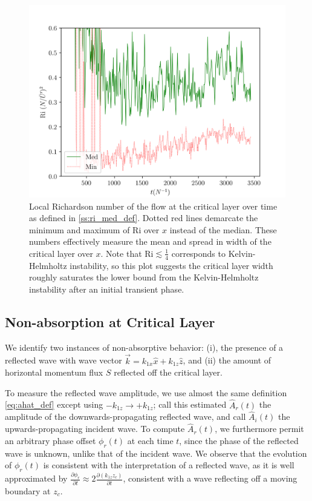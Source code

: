 \documentclass[
        fleqn,
        usenatbib,
    ]{mnras}
\newcommand*{\pd}[2]{\frac{\partial#1}{\partial#2}}
\begin{document}
\begin{figure}[t]
    \centering
    \includegraphics[width=\columnwidth]{plots/nl_f_ri.png}
    \caption{Local Richardson number of the flow at the critical layer over time
    as defined in \autoref{ss:ri_med_def}. Dotted red lines demarcate the
    minimum and maximum of $\mathrm{Ri}$ over $x$ instead of the median. These
    numbers effectively measure the mean and spread in width of the critical
    layer over $x$. Note that $\mathrm{Ri} \lesssim \frac{1}{4}$ corresponds
    to Kelvin-Helmholtz instability, so this plot suggests the critical layer
    width roughly saturates the lower bound from the Kelvin-Helmholtz
    instability after an initial transient phase.}\label{fig:nl_f_ri}
\end{figure}

\subsection{Non-absorption at Critical Layer}\label{ss:reflectivity}

We identify two instances of non-absorptive behavior: (i), the presence of a
reflected wave with wave vector $\vec{k} = k_{1x}\hat{x} + k_{1z}\hat{z}$, and
(ii) the amount of horizontal momentum flux $S$ reflected off the critical
layer.

To measure the reflected wave amplitude, we use almost the same definition
\autoref{eq:ahat_def} except using $-k_{1z} \to +k_{1z}$; call this estimated
$\hat{A}_r(t)$ the amplitude of the downwards-propagating reflected wave, and
call $\hat{A}_i(t)$ the upwards-propagating incident wave. To compute
$\hat{A}_r(t)$, we furthermore permit an arbitrary phase offset $\phi_r(t)$ at
each time $t$, since the phase of the reflected wave is unknown, unlike that of
the incident wave. We observe that the evolution of $\phi_r(t)$ is consistent
with the interpretation of a reflected wave, as it is well approximated by
$\pd{\phi_r}{t} \approx 2\pd{(k_{1z}z_c)}{t}$, consistent with a wave reflecting
off a moving boundary at $z_c$.
\end{document}
